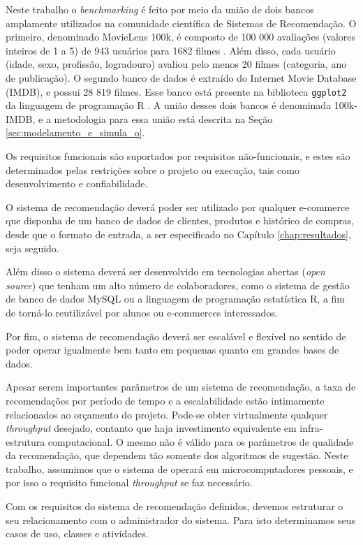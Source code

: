 Neste trabalho o \textit{benchmarking} é feito por meio da união de dois bancos amplamente utilizados na comunidade científica de Sistemas de Recomendação. O primeiro, denominado MovieLens 100k, é composto de 100 000 avaliações (valores inteiros de 1 a 5) de 943 usuários para 1682 filmes \cite{movielensdataset}. Além disso, cada usuário (idade, sexo, profissão, logradouro) avaliou pelo menos 20 filmes (categoria, ano de publicação). O segundo banco de dados é extraído do Internet Movie Database (IMDB), e possui 28 819 filmes. Esse banco está presente na biblioteca \texttt{ggplot2} da linguagem de programação R \cite{moviesggplot2dataset}. A união desses dois bancos é denominada 100k-IMDB, e a metodologia para essa união está descrita na Seção \ref{sec:modelamento_e_simula_o}.

Os requisitos funcionais são suportados por requisitos não-funcionais, e estes são determinados pelas restrições sobre o projeto ou execução, tais como desenvolvimento e confiabilidade.

O sistema de recomendação deverá poder ser utilizado por qualquer e-commerce que disponha de um banco de dados de clientes, produtos e histórico de compras, desde que o formato de entrada, a ser especificado no Capítulo \ref{chap:resultados}, seja seguido.

Além disso o sistema deverá ser desenvolvido em tecnologias abertas (\textit{open source}) que tenham um alto número de colaboradores, como o sistema de gestão de banco de dados MySQL ou a linguagem de programação estatística R, a fim de torná-lo reutilizável por alunos ou e-commerces interessados.

Por fim, o sistema de recomendação deverá ser escalável e flexível no sentido de poder operar igualmente bem tanto em pequenas quanto em grandes bases de dados.

Apesar serem importantes parâmetros de um sistema de recomendação, a taxa de recomendações por período de tempo e a escalabilidade estão intimamente relacionados ao orçamento do projeto. Pode-se obter virtualmente qualquer \textit{throughput} desejado, contanto que haja investimento equivalente em infra-estrutura computacional. O mesmo não é válido para os parâmetros de qualidade da recomendação, que dependem tão somente dos algoritmos de sugestão. Neste trabalho, assumimos que o sistema de operará em microcomputadores pessoais, e por isso o requisito funcional \textit{throughput} se faz necessário.

Com os requisitos do sistema de recomendação definidos, devemos estruturar o seu relacionamento com o administrador do sistema. Para isto determinamos seus casos de uso, classes e atividades.

